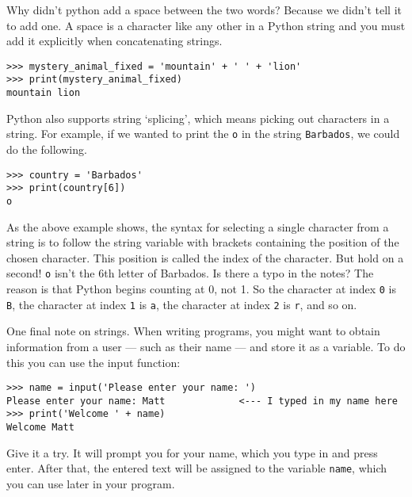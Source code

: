 Why didn’t python add a space between the two words? Because we didn’t tell it to add one. A space is a character like any other in a Python string and you must add it explicitly when concatenating strings.

\begin{lstlisting}[numbers=none, showstringspaces=true]
>>> mystery_animal_fixed = 'mountain' + ' ' + 'lion'
>>> print(mystery_animal_fixed)
mountain lion
\end{lstlisting}

Python also supports string ‘splicing’, which means picking out characters in a string. For example, if we wanted to print the \texttt{\textquotesingle o\textquotesingle} in the string \texttt{\textquotesingle Barbados\textquotesingle}, we could do the following.

\begin{lstlisting}[numbers=none]
>>> country = 'Barbados'
>>> print(country[6])
o
\end{lstlisting}

As the above example shows, the syntax for selecting a single character from a string is to follow the string variable with brackets containing the position of the chosen character. This position is called the index of the character. But hold on a second! \texttt{\textquotesingle o\textquotesingle} isn’t the 6th letter of Barbados. Is there a typo in the notes? The reason is that Python begins counting at 0, not 1. So the character at index \texttt{0} is \texttt{\textquotesingle B\textquotesingle}, the character at index \texttt{1} is \texttt{\textquotesingle a\textquotesingle}, the character at index \texttt{2} is \texttt{\textquotesingle r\textquotesingle}, and so on. 

One final note on strings. When writing programs, you might want to obtain information from a user --- such as their name --- and store it as a variable. To do this you can use the input function:

\begin{lstlisting}[numbers=none]
>>> name = input('Please enter your name: ')
Please enter your name: Matt             <--- I typed in my name here
>>> print('Welcome ' + name)
Welcome Matt
\end{lstlisting}

Give it a try. It will prompt you for your name, which you type in and press enter. After that, the entered text will be assigned to the variable \texttt{name}, which you can use later in your program.



